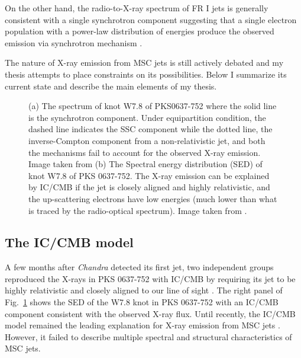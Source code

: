 On the other hand, the radio-to-X-ray spectrum of FR I jets is generally consistent with a single synchrotron component \citep[e.g.,][]{Marshall_2002,Hardcastle_2003} suggesting that a single electron population with a power-law distribution of energies produce the observed emission via synchrotron mechanism \citep[for a notable exeception, see][]{meyer2018detection}. 

The nature of X-ray emission from MSC jets is still actively debated and my thesis attempts to place constraints on its possibilities. Below I summarize its current state and describe the main elements of my thesis.
\begin{figure}[h!]
    \caption{ (a) The spectrum of knot W7.8 of PKS0637-752 where the solid line is the synchrotron component. Under equipartition condition, the dashed line indicates the SSC component while the dotted line, the inverse-Compton component from a non-relativistic jet, and both the mechanisms fail to account for the observed X-ray emission. Image taken from \citet{chartas2000chandra} (b) The Spectral energy distribution (SED) of knot W7.8 of PKS 0637-752. The X-ray emission can be explained by IC/CMB if the jet is closely aligned and highly relativistic, and the up-scattering electrons have low energies (much lower than what is traced by the radio-optical spectrum). Image taken from \citet{tavecchio2000x}.
    \label{fig:w7.8_sed} }
\end{figure}

\subsection{The IC/CMB model}
A few months after \textit{Chandra} detected its first jet, two independent groups reproduced the X-rays in PKS 0637-752 with IC/CMB  by requiring its jet to be highly relativistic and closely aligned to our line of sight \citep{tavecchio2000x,celotti2001large}. The right panel of Fig.~\ref{fig:w7.8_sed} shows the SED of the W7.8 knot in PKS 0637-752 with an IC/CMB component consistent with the observed X-ray flux. Until recently, the IC/CMB model remained the leading explanation for X-ray emission from MSC jets \citep[e.g.,][]{sambruna2004survey,miller2006x,sambruna2006jet,2012ApJ...748...81K}. However,
it failed to describe multiple spectral and structural characteristics of MSC jets.
